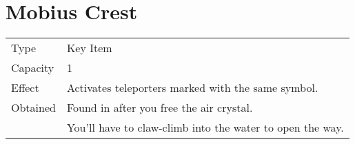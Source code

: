 \section{Mobius Crest}
\label{item:mobius_crest}


\noindent\begin{tabularx}{\textwidth}[l]{lX}
	Type
	& Key Item
\\
	Capacity
	& 1
\\
	Effect
	& Activates teleporters marked with the same symbol.
\\
	Obtained
	& Found in \nameref{map:spencers_place} after you free the air crystal. \\
	& You’ll have to claw-climb into the water to open the way.
\end{tabularx}
